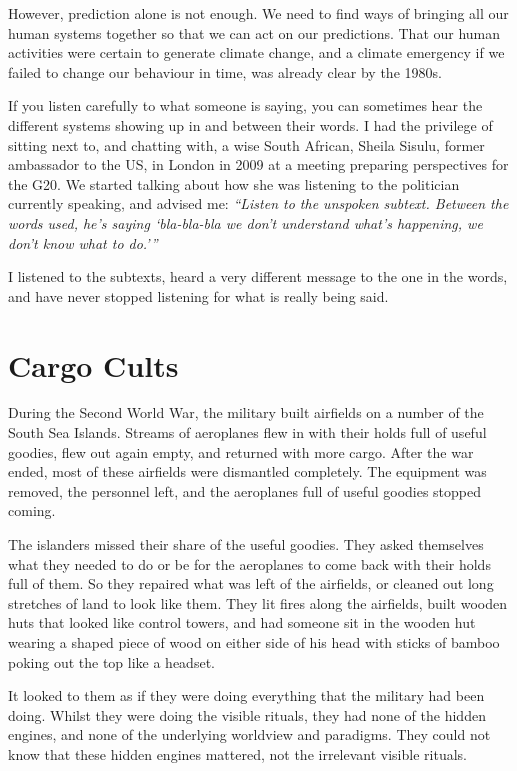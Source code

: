 However, prediction alone is not enough. We need to find ways of bringing all our human systems together so that we can act on our predictions. That our human activities were certain to generate climate change, and a climate emergency if we failed to change our behaviour in time, was already clear by the 1980s.


If you listen carefully to what someone is saying, you can sometimes hear the different systems showing up in and between their words. I had the privilege of sitting next to, and chatting with, a wise South African, Sheila Sisulu, former ambassador to the US, in London in 2009 at a meeting preparing perspectives for the G20. We started talking about how she was listening to the politician currently speaking, and advised me: \emph{“Listen to the unspoken subtext. Between the words used, he’s saying ‘bla-bla-bla we don’t understand what’s happening, we don’t know what to do.’”}


I listened to the subtexts, heard a very different message to the one in the words, and have never stopped listening for what is really being said. 
\section{Cargo Cults}
\label{section:cargo-cults}
During the Second World War, the military built airfields on a number of the South Sea Islands. Streams of aeroplanes flew in with their holds full of useful goodies, flew out again empty, and returned with more cargo. After the war ended, most of these airfields were dismantled completely. The equipment was removed, the personnel left, and the aeroplanes full of useful goodies stopped coming.


The islanders missed their share of the useful goodies. They asked themselves what they needed to do or be for the aeroplanes to come back with their holds full of them. So they repaired what was left of the airfields, or cleaned out long stretches of land to look like them. They lit fires along the airfields, built wooden huts that looked like control towers, and had someone sit in the wooden hut wearing a shaped piece of wood on either side of his head with sticks of bamboo poking out the top like a headset.


It looked to them as if they were doing everything that the military had been doing. Whilst they were doing the visible rituals, they had none of the hidden engines, and none of the underlying worldview and paradigms. They could not know that these hidden engines mattered, not the irrelevant visible rituals.


